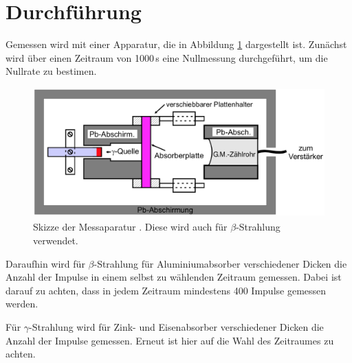 \section{Durchführung}
\label{sec:Durchführung}

Gemessen wird mit einer Apparatur, die in Abbildung \ref{fig:geraet} dargestellt
ist. Zunächst wird über einen Zeitraum von 1000\,s eine Nullmessung durchgeführt,
um die Nullrate zu bestimen.

\begin{figure}
  \centering
  \includegraphics[height=5cm]{data/aufbau.png}
  \caption{Skizze der Messaparatur \cite{Versuchsanleitung}. Diese wird auch
  für $\beta$-Strahlung verwendet.}
  \label{fig:geraet}
\end{figure}

Daraufhin wird für $\beta$-Strahlung für Aluminiumabsorber verschiedener Dicken
die Anzahl der Impulse in einem selbst zu wählenden Zeitraum gemessen. Dabei ist
darauf zu achten, dass in jedem Zeitraum mindestens 400 Impulse gemessen werden.

Für $\gamma$-Strahlung wird für Zink- und Eisenabsorber verschiedener Dicken
die Anzahl der Impulse gemessen. Erneut ist hier auf die Wahl des Zeitraumes
zu achten.
